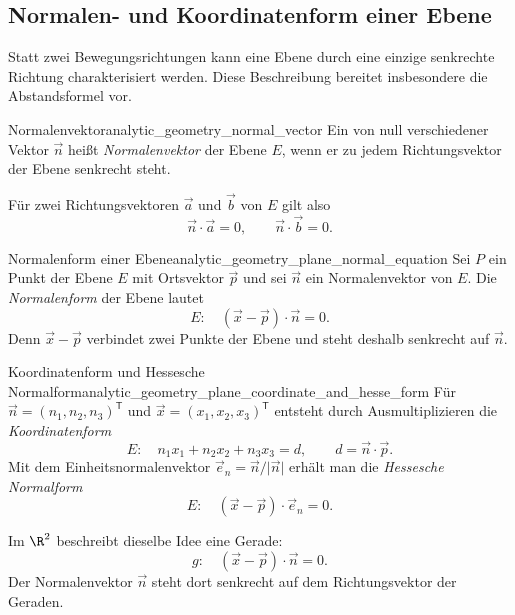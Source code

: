 \subsection{Normalen- und Koordinatenform einer Ebene}
\label{subsec:analytic_geometry_plane_normal_form}

Statt zwei Bewegungsrichtungen kann eine Ebene durch eine einzige senkrechte
Richtung charakterisiert werden. Diese Beschreibung bereitet insbesondere die
Abstandsformel vor.

\begin{DefinitionBox}{Normalenvektor}{analytic_geometry_normal_vector}
  Ein von null verschiedener Vektor $\vec n$ heißt
  \emph{Normalenvektor}  der Ebene $E$, wenn er zu
  jedem Richtungsvektor der Ebene senkrecht steht.

  Für zwei Richtungsvektoren $\vec a$ und $\vec b$ von $E$ gilt also
  \[
    \vec n\cdot\vec a=0,
    \qquad
    \vec n\cdot\vec b=0.
  \]
\end{DefinitionBox}

\begin{center}
\end{center}

\begin{TheoremBox}{Normalenform einer Ebene}{analytic_geometry_plane_normal_equation}
  Sei $P$ ein Punkt der Ebene $E$ mit Ortsvektor $\vec p$ und sei $\vec n$ ein
  Normalenvektor von $E$. Die \emph{Normalenform}
   der Ebene lautet
  \[
    E:\quad (\vec x-\vec p)\cdot\vec n=0.
  \]
  Denn $\vec x-\vec p$ verbindet zwei Punkte der Ebene und steht deshalb
  senkrecht auf $\vec n$.
\end{TheoremBox}

\begin{KeyPointBox}{Koordinatenform und Hessesche Normalform}{analytic_geometry_plane_coordinate_and_hesse_form}
  Für $\vec n=(n_1,n_2,n_3)^{\mathsf T}$ und
  $\vec x=(x_1,x_2,x_3)^{\mathsf T}$ entsteht durch Ausmultiplizieren die
  \emph{Koordinatenform} 
  \[
    E:\quad n_1x_1+n_2x_2+n_3x_3=d,
    \qquad d=\vec n\cdot\vec p.
  \]
  Mit dem Einheitsnormalenvektor
  $\vec e_n=\vec n/\lvert\vec n\rvert$ erhält man die
  \emph{Hessesche Normalform} 
  \[
    E:\quad (\vec x-\vec p)\cdot\vec e_n=0.
  \]
\end{KeyPointBox}

\begin{RemarkBox}[title=Geraden im zweidimensionalen Raum]
  Im $\R^2$ beschreibt dieselbe Idee eine Gerade:
  \[
    g:\quad (\vec x-\vec p)\cdot\vec n=0.
  \]
  Der Normalenvektor $\vec n$ steht dort senkrecht auf dem Richtungsvektor der
  Geraden.
\end{RemarkBox}
